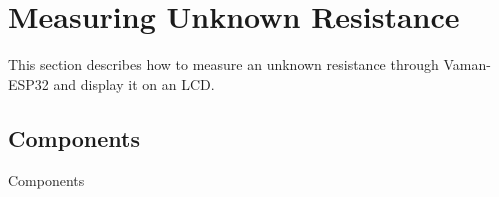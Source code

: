\section{Measuring Unknown Resistance}
This section describes how to measure an unknown resistance through Vaman-ESP32 
and display it on an LCD.
\subsection{Components}

\begin{table}[!ht]
\centering

\caption{Components}
\label{table:components}
\end{table}


